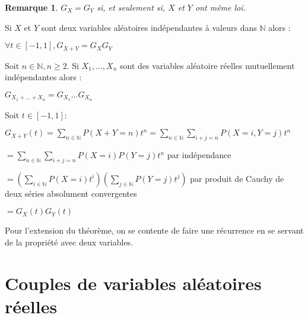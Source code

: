 \documentclass[a4paper,12pt]{book}
\newcommand{\Thr}[2]{\begin{tcolorbox}[sharp corners, colback=white,colframe=red!90!black!75, title=Théorème : #1]#2\end{tcolorbox}}
\newcommand{\Pre}[1]{\begin{tcolorbox}[sharp corners, colback=white,colframe=green!60!green!30!black!75, title=Preuve]#1\end{tcolorbox}}
\newtheorem{Rem}{Remarque}[section]
\def\N{\mathbb{N}}
\begin{document}
\begin{Rem}
$G_X=G_Y$ si, et seulement si, $X$ et $Y$ ont même loi.
\end{Rem}
\Thr{}{Si $X$ et $Y$ sont deux variables aléatoires indépendantes à valeurs dans $\N$ alors :\par\begin{center}$\forall t\in[-1,1], G_{X+Y}=G_XG_Y$\end{center}
\par Soit $n\in\N, n\geq 2$. Si $X_1,...,X_n$ sont des variables aléatoire réelles mutuellement indépendantes alors : \par\begin{center}$G_{X_1+...+X_n}=G_{X_1}...G_{X_n}$\end{center}}
\Pre{Soit $t\in[-1,1]$:
\par $G_{X+Y}(t)=\sum\limits_{n\in\N}P(X+Y=n)t^n =\sum\limits_{n\in\N}\sum\limits_{i+j=n}P(X=i,Y=j)t^n$
\par $= \sum\limits_{n\in\N}\sum\limits_{i+j=n}P(X=i)P(Y=j)t^n$ par indépendance
\par $=\left(\sum\limits_{i\in\N}P(X=i)t^i\right) \left(\sum\limits_{j\in\N}P(Y=j)t^j\right)$ par produit de Cauchy de deux séries absolument convergentes
\par $=G_X(t)G_Y(t)$
\par Pour l'extension du théorème, on se contente de faire une récurrence en se servant de la propriété avec deux variables.}



\section{Couples de variables aléatoires réelles}
\end{document}
